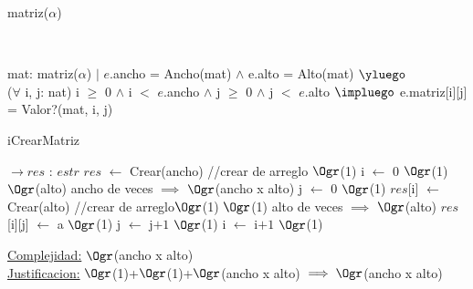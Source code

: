 \begin{Representacion}
	
	
	\begin{Estructura}{matriz($\alpha$)}
		 \begin{Tupla}[estr]
		\end{Tupla}
	\end{Estructura}
	
	
	~	
	
	{mat: matriz($\alpha$) $|$ $e$.ancho = Ancho(mat) $\land$ e.alto = Alto(mat) $\yluego$\\
	($\forall$ i, j: nat) i $\geq$ $0$ $\land$ i $<$ $e$.ancho $\land$ j $\geq$ $0$ $\land$ j $<$ $e$.alto $\impluego$ e.matriz[i][j] = Valor?(mat, i, j) }
	
\begin{Algoritmos}
	
	\begin{algorithm}[H]
		\caption{iCrearMatriz}
		
		\begin{algorithmic}[1]
			 $\to res$ : $estr$
			\State $res$ $\leftarrow$ Crear(ancho) //crear de arreglo \Comment $\Ogr$(1)
			\State i $\leftarrow$ $0$ \Comment $\Ogr$(1)
			 \Comment $\Ogr$(alto) ancho de veces $\implies$ $\Ogr$(ancho x alto)
				\State j $\leftarrow$ $0$ \Comment $\Ogr$(1)
				\State $res$[i] $\leftarrow$ Crear(alto) //crear de arreglo\Comment $\Ogr$(1)
				 \Comment $\Ogr$(1) alto de veces $\implies$  $\Ogr$(alto)
					\State $res$[i][j] $\leftarrow$ a \Comment $\Ogr$(1)
					\State j $\leftarrow$ j$+1$ \Comment $\Ogr$(1)
				\EndWhile
				\State i $\leftarrow$ i$+1$ \Comment $\Ogr$(1)
			\EndWhile
			\EndProcedure
		\end{algorithmic}
		\underline{Complejidad:} $\Ogr$(ancho x alto)
		\\
		\underline{Justificacion:} $\Ogr$(1)+$\Ogr$(1)+$\Ogr$(ancho x alto) $\implies \Ogr$(ancho x alto)
		

\end{algorithm}
\end{Algoritmos}
\end{Representacion}
